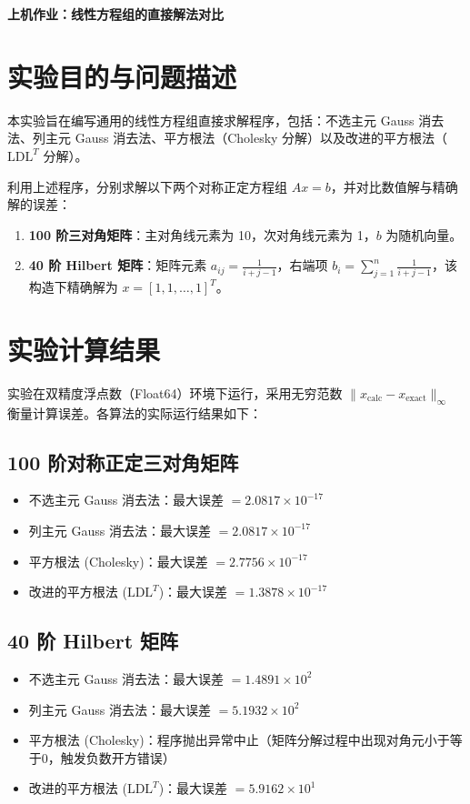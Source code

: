 \documentclass[a4paper,11pt]{article}
\begin{document}
\begin{center}
    \Large\textbf{上机作业：线性方程组的直接解法对比}
\end{center}

\section{实验目的与问题描述}
本实验旨在编写通用的线性方程组直接求解程序，包括：不选主元 Gauss 消去法、列主元 Gauss 消去法、平方根法（Cholesky 分解）以及改进的平方根法（$\text{LDL}^T$ 分解）。

利用上述程序，分别求解以下两个对称正定方程组 $Ax=b$，并对比数值解与精确解的误差：
\begin{enumerate}
    \item \textbf{100 阶三对角矩阵}：主对角线元素为 10，次对角线元素为 1，$b$ 为随机向量。
    \item \textbf{40 阶 Hilbert 矩阵}：矩阵元素 $a_{ij} = \frac{1}{i+j-1}$，右端项 $b_i = \sum_{j=1}^n \frac{1}{i+j-1}$，该构造下精确解为 $x =[1, 1, \dots, 1]^T$。
\end{enumerate}

\section{实验计算结果}
实验在双精度浮点数（Float64）环境下运行，采用无穷范数 $\|x_{\text{calc}} - x_{\text{exact}}\|_\infty$ 衡量计算误差。各算法的实际运行结果如下：

\subsection{100 阶对称正定三对角矩阵}
\begin{itemize}
    \item 不选主元 Gauss 消去法：最大误差 $= 2.0817 \times 10^{-17}$
    \item 列主元 Gauss 消去法：最大误差 $= 2.0817 \times 10^{-17}$
    \item 平方根法 (Cholesky)：最大误差 $= 2.7756 \times 10^{-17}$
    \item 改进的平方根法 ($\text{LDL}^T$)：最大误差 $= 1.3878 \times 10^{-17}$
\end{itemize}

\subsection{40 阶 Hilbert 矩阵}
\begin{itemize}
    \item 不选主元 Gauss 消去法：最大误差 $= 1.4891 \times 10^2$
    \item 列主元 Gauss 消去法：最大误差 $= 5.1932 \times 10^2$
    \item 平方根法 (Cholesky)：程序抛出异常中止（矩阵分解过程中出现对角元小于等于0，触发负数开方错误）
    \item 改进的平方根法 ($\text{LDL}^T$)：最大误差 $= 5.9162 \times 10^1$
\end{itemize}
\end{document}
